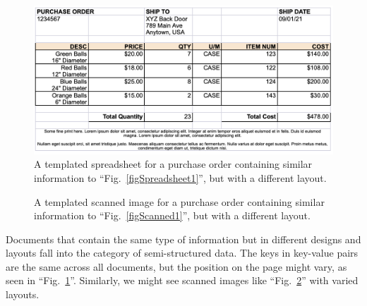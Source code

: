 \documentclass[conference]{IEEEtran}
\begin{document}
\begin{figure}[ht]
\centerline{\includegraphics[width=\columnwidth]{Spreadsheet2.png}}
\caption{A templated spreadsheet for a purchase order containing similar information to ``Fig.~\ref{figSpreadsheet1}'', but with a different layout.}
\label{figSpreadsheet2}
\end{figure}

\begin{figure}[ht]
    \centerline{
}
\caption{A templated scanned image for a purchase order containing similar information to ``Fig.~\ref{figScanned1}'', but with a different layout.}
\label{figScanned2}
\end{figure}

Documents that contain the same type of information but in different designs and layouts fall into the category of semi-structured data. The keys in key-value pairs are the same across all documents, but the position on the page might vary, as seen in ``Fig.~\ref{figSpreadsheet2}''. Similarly, we might see scanned images like ``Fig.~\ref{figScanned2}'' with varied layouts.
\end{document}
